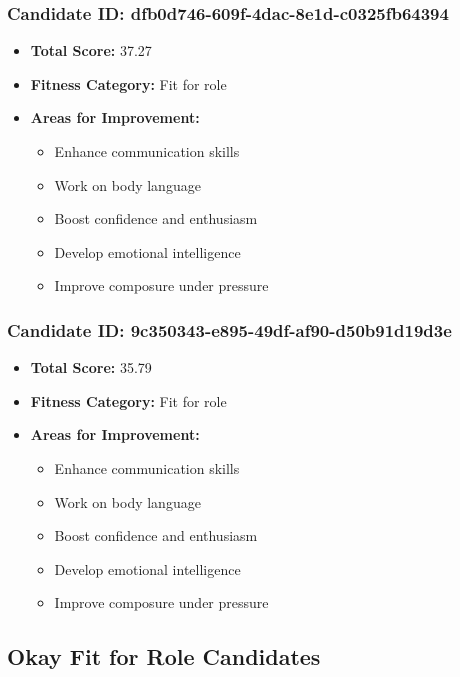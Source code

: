 \documentclass{article}
\begin{document}
\subsubsection{Candidate ID: dfb0d746-609f-4dac-8e1d-c0325fb64394}
\begin{itemize}
    \item \textbf{Total Score:} 37.27
    \item \textbf{Fitness Category:} Fit for role
    \item \textbf{Areas for Improvement:}
    \begin{itemize}
        \item Enhance communication skills
        \item Work on body language
        \item Boost confidence and enthusiasm
        \item Develop emotional intelligence
        \item Improve composure under pressure
    \end{itemize}
\end{itemize}

\subsubsection{Candidate ID: 9c350343-e895-49df-af90-d50b91d19d3e}
\begin{itemize}
    \item \textbf{Total Score:} 35.79
    \item \textbf{Fitness Category:} Fit for role
    \item \textbf{Areas for Improvement:}
    \begin{itemize}
        \item Enhance communication skills
        \item Work on body language
        \item Boost confidence and enthusiasm
        \item Develop emotional intelligence
        \item Improve composure under pressure
    \end{itemize}
\end{itemize}

\subsection{Okay Fit for Role Candidates}
\end{document}

